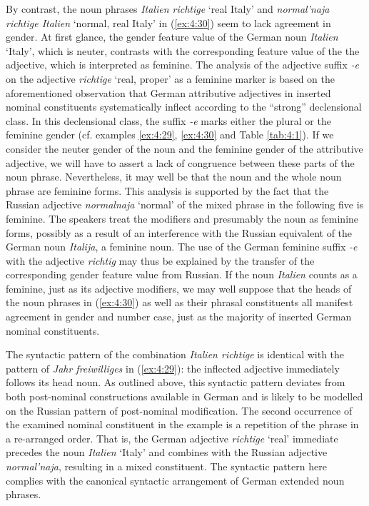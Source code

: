 \begin{sloppypar}
By contrast, the noun phrases \textit{Italien richtige} `real Italy' and \textit{normal'naja richtige Italien} `normal, real Italy' in (\ref{ex:4:30}) seem to lack agreement in gender. At first glance, the gender feature value of the German noun \textit{Italien} `Italy', which is neuter, contrasts with the corresponding feature value of the the adjective, which is interpreted as feminine. The analysis of the adjective suffix \textit{-e} on the adjective \textit{richtige} `real, proper' as a feminine marker is based on the aforementioned observation that German attributive adjectives in inserted nominal constituents systematically inflect according to the “strong” declensional class. In this declensional class, the suffix \textit{-e} marks either the plural or the feminine gender (cf. examples \ref{ex:4:29}, \ref{ex:4:30} and Table \ref{tab:4:1}). If we consider the neuter gender of the noun and the feminine gender of the attributive adjective, we will have to assert a lack of congruence between these parts of the noun phrase. Nevertheless, it may well be that the noun and the whole noun phrase are feminine forms. This analysis is supported by the fact that the Russian adjective \textit{normalnaja} `normal' of the mixed phrase in the following five is feminine. The speakers treat the modifiers and presumably the noun as feminine forms, possibly as a result of an interference with the Russian equivalent of the German noun \textit{Italija}, a feminine noun. The use of the German feminine suffix \textit{-e} with the adjective \textit{richtig} may thus be explained by the transfer of the corresponding gender feature value from Russian. If  the noun \textit{Italien} counts as a feminine, just as its adjective modifiers, we may well suppose that the heads of the noun phrases in (\ref{ex:4:30}) as well as their phrasal constituents all manifest agreement in gender and number case, just as the majority of inserted German nominal constituents.
\end{sloppypar}

The syntactic pattern of the combination \textit{Italien richtige} is identical with the pattern of \textit{Jahr freiwilliges} in (\ref{ex:4:29}): the inflected adjective immediately follows its head noun. As outlined above, this syntactic pattern deviates from both post-nominal constructions available in German and is likely to be modelled on the Russian pattern of post-nominal modification. The second occurrence of the examined nominal constituent in the example is a repetition of the phrase in a re-arranged order. That is, the German adjective \textit{richtige} `real' immediate precedes the noun \textit{Italien} `Italy' and combines with the Russian adjective \textit{normal'naja}, resulting in a mixed constituent. The syntactic pattern here complies with the canonical syntactic arrangement of German extended noun phrases.

